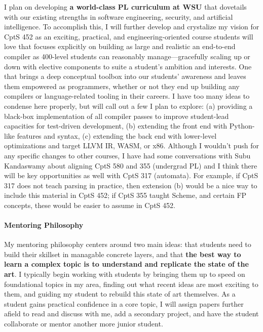 \documentclass[12pt]{article}
\begin{document}
I plan on developing \textbf{a world-class PL curriculum at WSU} that dovetails with our existing strengths in software engineering, security, and artificial intelligence. To accomplish this, I will further develop and crystalize my vision for CptS 452 as an exciting, practical, and engineering-oriented course students will love that focuses explicitly on building as large and realistic an end-to-end compiler as 400-level students can reasonably manage---gracefully scaling up or down with elective components to suite a student's ambition and interests. One that brings a deep conceptual toolbox into our students' awareness and leaves them empowered as programmers, whether or not they end up building any compilers or language-related tooling in their careers. I have too many ideas to condense here properly, but will call out a few I plan to explore: (a) providing a black-box implementation of all compiler passes to improve student-lead capacities for test-driven development, (b) extending the front end with Python-like features and syntax, (c) extending the back end with lower-level optimizations and target LLVM IR, WASM, or x86. Although I wouldn't push for any specific changes to other courses, I have had some conversations with Subu Kandaswamy about aligning CptS 580 and 355 (undergrad PL) and I think there will be key opportunities as well with CptS 317 (automata). For example, if CptS 317 does not teach parsing in practice, then extension (b) would be a nice way to include this material in CptS 452; if CptS 355 taught Scheme, and certain FP concepts, these would be easier to assume in CptS 452.


\paragraph{Mentoring Philosophy}

My mentoring philosophy centers around two main ideas: that students need to build their skillset in managable concrete layers, and that \textbf{the best way to learn a complex topic is to understand and replicate the state of the art}. I typically begin working with students by bringing them up to speed on foundational topics in my area, finding out what recent ideas are most exciting to them, and guiding my student to rebuild this state of art themselves. As a student gains practical confidence in a core topic, I will assign papers further afield to read and discuss with me, add a secondary project, and have the student collaborate or mentor another more junior student. 
\end{document}
